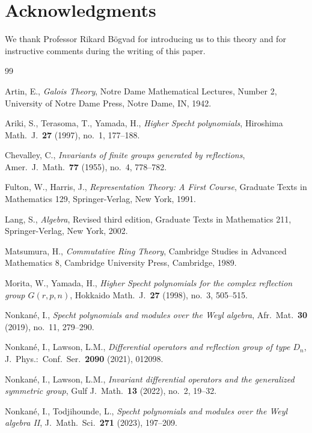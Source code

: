 \documentclass[11pt,a4paper]{article}
\begin{document}
\section*{Acknowledgments}

We thank Professor Rikard B\"ogvad for introducing us to this theory
and for instructive comments during the writing of this paper.

\begin{thebibliography}{99}

 Artin, E., \emph{Galois Theory}, Notre Dame
Mathematical Lectures, Number 2, University of Notre Dame Press,
Notre Dame, IN, 1942.

 Ariki, S., Terasoma, T., Yamada, H.,
\emph{Higher Specht polynomials}, Hiroshima Math.\ J.\ \textbf{27}
(1997), no.\ 1, 177--188.

 Chevalley, C., \emph{Invariants of finite
groups generated by reflections}, Amer.\ J.\ Math.\ \textbf{77}
(1955), no.\ 4, 778--782.

 Fulton, W., Harris, J.,
\emph{Representation Theory: A First Course}, Graduate Texts in
Mathematics 129, Springer-Verlag, New York, 1991.

 Lang, S., \emph{Algebra}, Revised third edition,
Graduate Texts in Mathematics 211, Springer-Verlag, New York, 2002.

 Matsumura, H., \emph{Commutative Ring Theory},
Cambridge Studies in Advanced Mathematics 8, Cambridge University
Press, Cambridge, 1989.

 Morita, W., Yamada, H., \emph{Higher
Specht polynomials for the complex reflection group $G(r,p,n)$},
Hokkaido Math.\ J.\ \textbf{27} (1998), no.\ 3, 505--515.

 Nonkan\'e, I., \emph{Specht polynomials and
modules over the Weyl algebra}, Afr.\ Mat.\ \textbf{30} (2019), no.\
11, 279--290.

 Nonkan\'e, I., Lawson, L.M.,
\emph{Differential operators and reflection group of type $D_n$},
J.\ Phys.:\ Conf.\ Ser.\ \textbf{2090} (2021), 012098.

 Nonkan\'e, I., Lawson, L.M.,
\emph{Invariant differential operators and the generalized symmetric
group}, Gulf J.\ Math.\ \textbf{13} (2022), no.\ 2, 19--32.

 Nonkan\'e, I., Todjihounde, L.,
\emph{Specht polynomials and modules over the Weyl algebra II},
J.\ Math.\ Sci.\ \textbf{271} (2023), 197--209.

\end{thebibliography}
\end{document}

